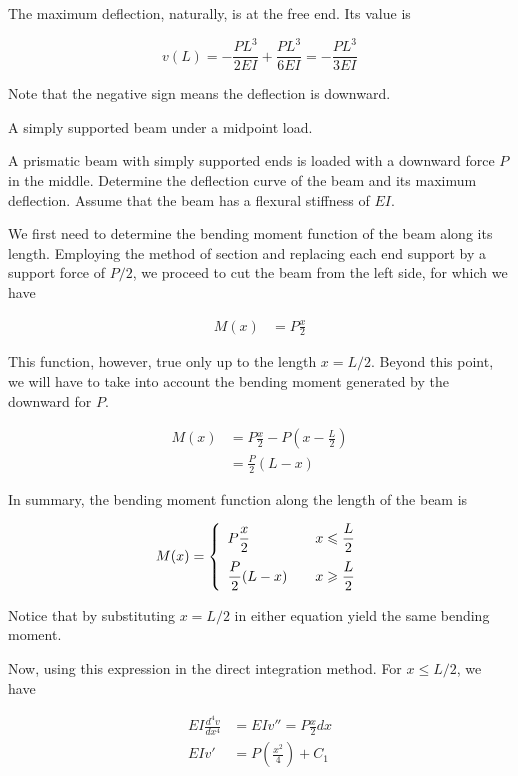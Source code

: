 \documentclass[a4paper,openany,12pt]{book}
\begin{document}
\begin{enumerate}
The maximum deflection, naturally, is at the free end. Its value is

$$v(L) =  - \frac{PL^3}{2EI} + \frac{PL^3}{6EI} =  - \frac{PL^3}{3EI}$$

Note that the negative sign means the deflection is downward.

A simply supported beam under a midpoint load.

A prismatic beam with simply supported ends is loaded with a downward
force \(P\) in the middle. Determine the deflection curve of the beam and
its maximum deflection. Assume that the beam has a flexural stiffness of
\(EI\).


We first need to determine the bending moment function of the beam along
its length. Employing the method of section and replacing each end
support by a support force of \(P/2\), we proceed to cut the beam from the
left side, for which we have

$$\begin{aligned}
    M(x) &= P\frac{x}{2}
  \end{aligned}$$

This function, however, true only up to the length \(x = L/2\). Beyond
this point, we will have to take into account the bending moment
generated by the downward for \(P\).

$$\begin{aligned}
    M(x) &= P\frac{x}{2} - P(x-\frac{L}{2}) \\
         &= \frac{P}{2}(L-x)
  \end{aligned}$$

In summary, the bending moment function along the length of the beam is

$$M(x) = \left\{
      \begin{array}{l l l}
        P\dfrac{x}{2} & & x \leqslant \dfrac{L}{2} \\[1em]
        \dfrac{P}{2}(L-x) & & x \geqslant \dfrac{L}{2}
      \end{array} \right.$$

Notice that by substituting \(x = L/2\) in either equation yield the same
bending moment.

Now, using this expression in the direct integration method. For
\(x \leqslant L/2\), we have

$$\begin{aligned}
    EI \frac{d^4v}{dx^4} &= EIv'' = P\frac{x}{2}dx \\
    EIv' &= P (\frac{x^2}{4}) + C_1 \\
  \end{aligned}$$


\end{enumerate}
\end{document}
